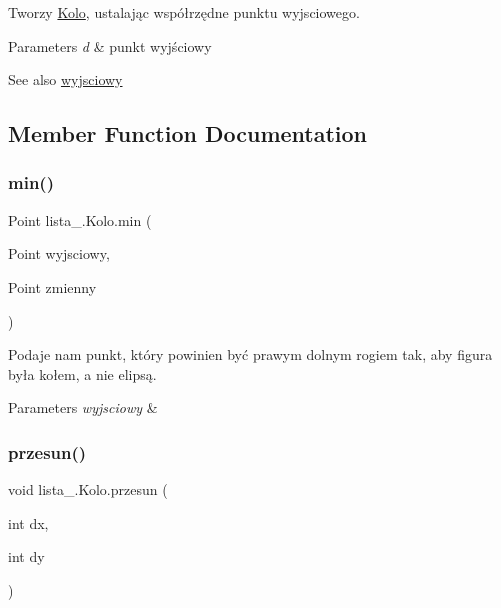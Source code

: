 Tworzy \mbox{\hyperlink{classlista__5_1_1_kolo}{Kolo}}, ustalając współrzędne punktu wyjsciowego. 
\begin{DoxyParams}{Parameters}
{\em d} & punkt wyjściowy \\
\hline
\end{DoxyParams}
\begin{DoxySeeAlso}{See also}
\mbox{\hyperlink{classlista__5_1_1_kolo_a6deef87b266a0c6c98fc920af90eb81a}{wyjsciowy}} 
\end{DoxySeeAlso}


\subsection{Member Function Documentation}
\mbox{\label{classlista__5_1_1_kolo_a4ec5879d3ec849a75bcb1690ed2a0c18}} 
\subsubsection{\texorpdfstring{min()}{min()}}
{\footnotesize\ttfamily Point lista\+\_.\+Kolo.\+min (\begin{DoxyParamCaption}\item[{Point}]{wyjsciowy,  }\item[{Point}]{zmienny }\end{DoxyParamCaption})\hspace{0.3cm}{\ttfamily [private]}}

Podaje nam punkt, który powinien być prawym dolnym rogiem tak, aby figura była kołem, a nie elipsą. 
\begin{DoxyParams}{Parameters}
{\em wyjsciowy} & \\
\hline
\end{DoxyParams}
\mbox{\label{classlista__5_1_1_kolo_ab984e23d3e45dd5a63dfccf6aeaae01a}} 
\subsubsection{\texorpdfstring{przesun()}{przesun()}}
{\footnotesize\ttfamily void lista\+\_.\+Kolo.\+przesun (\begin{DoxyParamCaption}\item[{int}]{dx,  }\item[{int}]{dy }\end{DoxyParamCaption})}

